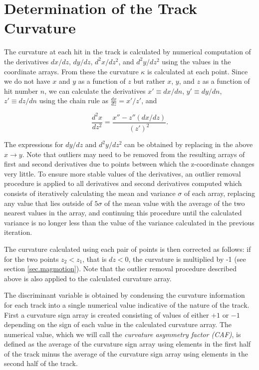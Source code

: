 \documentclass{JINST}
\begin{document}
\section{Determination of the Track Curvature}\label{ssec:curvature}
The curvature at each hit in the track is calculated by numerical computation of the derivatives $dx/dz$, $dy/dz$, $d^2x/dz^2$, and $d^2y/dz^2$ using the values in the coordinate arrays.  From these the curvature $\kappa$ is calculated at each point.  Since we do not have $x$ and $y$ as a function of $z$ but rather $x$, $y$, and $z$ as a function of hit number $n$, we can calculate the derivatives $x' \equiv dx/dn$, $y' \equiv dy/dn$, $z' \equiv dz/dn$ using the chain rule as $\frac{dx}{dz} = x'/z'$, and

\begin{equation}
\frac{d^2x}{dz^2} = \frac{x'' - z''(dx/dz)}{(z')^2}.
\end{equation}

The expressions for $dy/dz$ and $d^2y/dz^2$ can be obtained by replacing in the above $x \rightarrow y$.  Note that outliers may need to be removed from the resulting arrays of first and second derivatives due to points between which the z-coordinate changes very little.  To ensure more stable values of the derivatives, an outlier removal procedure is applied to all derivatives and second derivatives computed which consists of iteratively calculating the mean and variance $\sigma$ of each array, replacing any value that lies outside of $5\sigma$ of the mean value with the average of the two nearest values in the array, and continuing this procedure until the calculated variance is no longer less than the value of the variance calculated in the previous iteration. %

The curvature calculated using each pair of points is then corrected as follows: if for the two points $z_2 < z_1$, that is 
$dz < 0$, the curvature is multiplied by -1 (see section \ref{sec.magmotion}).  Note that the outlier removal procedure described above is also applied to the calculated curvature array.  

The discriminant variable is obtained by condensing the curvature information for each track into a single numerical value indicative of the nature of the track.  First a curvature sign array is created 
consisting of values of either $+1$ or $-1$ depending on the sign of each value in the calculated curvature array.  The 
numerical value, which we will
call the {\em curvature asymmetry factor (CAF)}, is defined as the average of the curvature sign array using elements in the first half of 
the track minus the average of the curvature sign array using elements in the second half of the track.  
\end{document}
